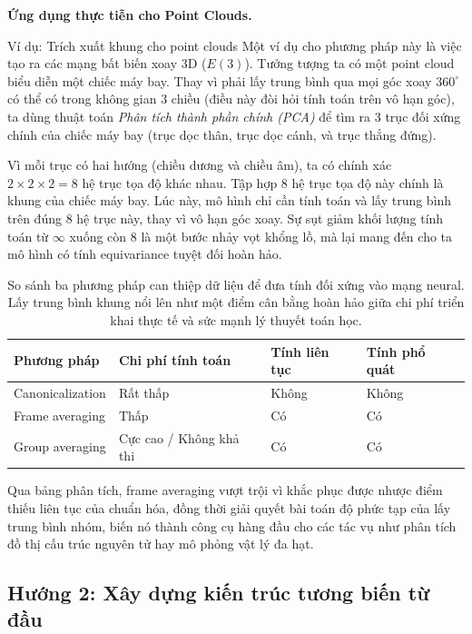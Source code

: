 \textbf{Ứng dụng thực tiễn cho Point Clouds.}

\begin{examplebox}{Ví dụ: Trích xuất khung cho point clouds}
Một ví dụ cho phương pháp này là việc tạo ra các mạng bất biến xoay 3D ($E(3)$). Tưởng tượng ta có một point cloud biểu diễn một chiếc máy bay. Thay vì phải lấy trung bình qua mọi góc xoay $360^\circ$ có thể có trong không gian 3 chiều (điều này đòi hỏi tính toán trên vô hạn góc), ta dùng thuật toán \textit{Phân tích thành phần chính (PCA)} để tìm ra 3 trục đối xứng chính của chiếc máy bay (trục dọc thân, trục dọc cánh, và trục thẳng đứng). 

Vì mỗi trục có hai hướng (chiều dương và chiều âm), ta có chính xác $2 \times 2 \times 2 = 8$ hệ trục tọa độ khác nhau. Tập hợp 8 hệ trục tọa độ này chính là khung của chiếc máy bay. Lúc này, mô hình chỉ cần tính toán và lấy trung bình trên đúng $8$ hệ trục này, thay vì vô hạn góc xoay. Sự sụt giảm khối lượng tính toán từ $\infty$ xuống còn $8$ là một bước nhảy vọt khổng lồ, mà lại mang đến cho ta mô hình có tính equivariance tuyệt đối hoàn hảo.
\end{examplebox}


\begin{table}[H]
\centering
\small
\begin{tabular}{p{}p{}p{}p{}}
\toprule
\textbf{Phương pháp} & \textbf{Chi phí tính toán} & \textbf{Tính liên tục} & \textbf{Tính phổ quát} \\
\midrule
Canonicalization & Rất thấp & Không & Không \\
Frame averaging & Thấp & Có & Có \\
Group averaging & Cực cao / Không khả thi & Có & Có \\
\bottomrule
\end{tabular}
\caption{So sánh ba phương pháp can thiệp dữ liệu để đưa tính đối xứng vào mạng neural. Lấy trung bình khung nổi lên như một điểm cân bằng hoàn hảo giữa chi phí triển khai thực tế và sức mạnh lý thuyết toán học.}
\label{tab:symmetrization-compare}
\end{table}

Qua bảng phân tích, frame averaging vượt trội vì khắc phục được nhược điểm thiếu liên tục của chuẩn hóa, đồng thời giải quyết bài toán độ phức tạp của lấy trung bình nhóm, biến nó thành công cụ hàng đầu cho các tác vụ như phân tích đồ thị cấu trúc nguyên tử hay mô phỏng vật lý đa hạt.


\subsection{Hướng 2: Xây dựng kiến trúc tương biến từ đầu}
\label{subsec:constructed}

